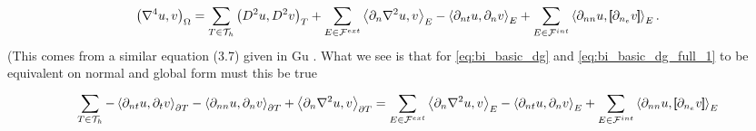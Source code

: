 \begin{equation}
\label{eq:bi_basic_dg_full_1}
\left( \nabla ^{4} u, v \right) _{\Omega }
= \sum_{T \in  \mathcal{T} _{h}}^{} \left( D^2u, D^2v \right)_{T}  + \sum_{E \in
\mathcal{F} ^{ext}_{}}^{} \left<\partial _{n} \nabla  ^2 u, v  \right> _{E}
- \left<\partial _{nt} u, \partial _{n} v \right> _{E}
+ \sum_{E \in \mathcal{F}  ^{int}}^{} \left<\partial _{nn} u , \left[\!\!\left[  \partial _{n_{e}} v  \right]\!\!\right]
\right>_{E}
.\end{equation}
(This comes from a similar equation (3.7) given in Gu \cite{gu2012c0}.
What we see is that for \eqref{eq:bi_basic_dg} and \eqref{eq:bi_basic_dg_full_1} to be equivalent on normal and global form must this be true
\[
 \sum_{T \in  \mathcal{T}_{h} }^{}  - \left<\partial _{nt} u, \partial _{t}v
\right>_{\partial T} - \left<\partial _{nn} u, \partial _{n}v \right>_{\partial T} + \left<\partial _{n} \nabla ^2 u,v
\right>_{\partial T}
=  \sum_{E \in
\mathcal{F}^{ext}  }^{} \left<\partial _{n} \nabla  ^2 u, v  \right> _{E}
- \left<\partial _{nt} u, \partial _{n} v \right> _{E}
+ \sum_{E \in \mathcal{F}^{int} }^{} \left<\partial _{nn} u , \left[\!\!\left[  \partial _{n_{e}} v  \right]\!\!\right]
\right>_{E}
\]




